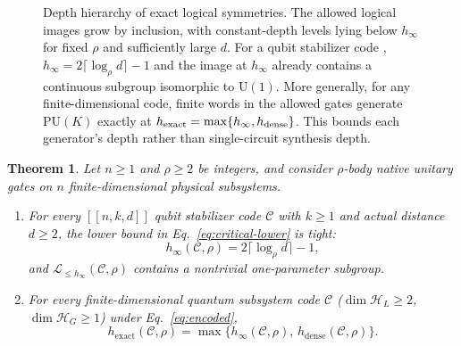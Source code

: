 \documentclass[aps,prl,reprint,notitlepage,nofootinbib,nobibnotes]{revtex4-2}
\newtheorem{theorem}{Theorem}
\newcommand{\HH}{\mathcal H}
\newcommand{\UU}{\mathrm U}
\newcommand{\PU}{\mathrm{PU}}
\begin{document}
\begin{figure}[htb]
{%
}
\caption{Depth hierarchy of exact logical symmetries. The allowed logical images grow by inclusion,
with constant-depth levels lying below $h_\infty$ for fixed $\rho$ and sufficiently large $d$. For
a qubit stabilizer code , $h_\infty=2\lceil\log_\rho d\rceil-1$ and the image at $h_\infty$
already contains a continuous subgroup isomorphic to $\UU(1)$. More generally, for any
finite-dimensional code, finite words in the allowed gates generate $\PU(K)$ exactly at $h_{\rm
exact}=\max\{h_\infty,h_{\rm dense}\}$. This bounds each generator's depth rather than
single-circuit synthesis depth.}
\label{fig:logical-hierarchy}
\end{figure}

\begin{samepage}
\begin{theorem}\label{thm:thresholds}
Let $n\ge1$ and $\rho\ge2$ be integers, and consider $\rho$-body native unitary gates on $n$
finite-dimensional physical subsystems.
\begin{enumerate}
\item[(1)] For every $[[n,k,d]]$ qubit stabilizer code  $\mathcal C$ with $k\ge1$ and
actual distance $d\ge2$, the lower bound in Eq.~\eqref{eq:critical-lower} is tight:
\begin{equation}\label{eq:critical}
 h_\infty(\mathcal C,\rho)=2\lceil\log_\rho d\rceil-1,
\end{equation}
and $\mathcal L_{\le h_\infty}(\mathcal C,\rho)$ contains a nontrivial one-parameter subgroup.
\item[(2)] For every finite-dimensional quantum subsystem code $\mathcal C$ ($\dim\HH_L\ge2$,
$\dim\HH_G\ge1$) under Eq.~\eqref{eq:encoded},
\begin{equation}\label{eq:exact-max}
 h_{\mathrm{exact}}(\mathcal C,\rho)
 =\max\{h_\infty(\mathcal C,\rho),\,h_{\mathrm{dense}}(\mathcal C,\rho)\}.
\end{equation}
\end{enumerate}
\end{theorem}
\end{samepage}
\end{document}
